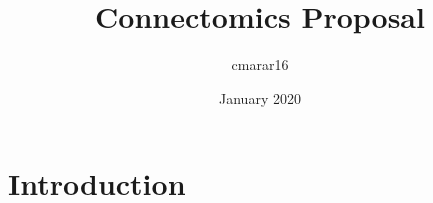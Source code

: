 \documentclass{article}
\title{Connectomics Proposal}
\author{cmarar16 }
\date{January 2020}
\begin{document}
\maketitle

\section{Introduction}
\end{document}

